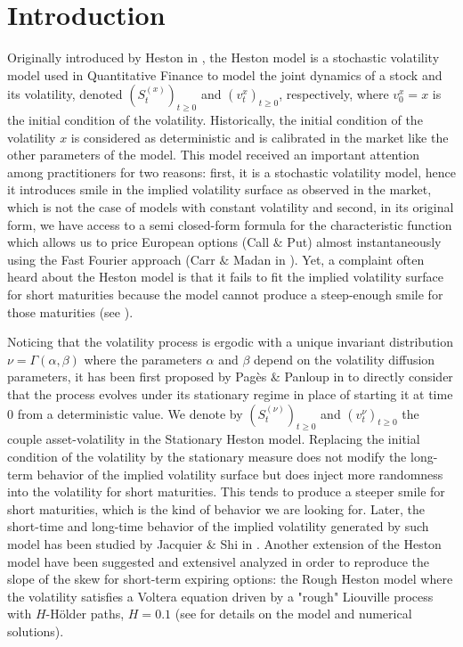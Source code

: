 

\section*{Introduction}


Originally introduced by Heston in \cite{heston1993closed}, the Heston model is a stochastic volatility model used in Quantitative Finance to model the joint dynamics of a stock and its volatility, denoted $(S_t^{(x)})_{t \geq 0}$ and $(v_t^x)_{t \geq 0}$, respectively, where $v_0^x = x$ is the initial condition of the volatility. Historically, the initial condition of the volatility $x$ is considered as deterministic and is calibrated in the market like the other parameters of the model. This model received an important attention among practitioners for two reasons: first, it is a stochastic volatility model, hence it introduces smile in the implied volatility surface as observed in the market, which is not the case of models with constant volatility and second, in its original form, we have access to a semi closed-form formula for the characteristic function which allows us to price European options (Call $\&$ Put) almost instantaneously using the Fast Fourier approach (Carr $\&$ Madan in \cite{carr1999option}). Yet, a complaint often heard about the Heston model is that it fails to fit the implied volatility surface for short maturities because the model cannot produce a steep-enough smile for those maturities (see \cite{gatheral2011volatility}).


Noticing that the volatility process is ergodic with a unique invariant distribution $\nu = \Gamma (\alpha, \beta)$ where the parameters $\alpha$ and $\beta$ depend on the volatility diffusion parameters, it has been first proposed by Pagès $\&$ Panloup in \cite{pages2009approximation} to directly consider that the process evolves under its stationary regime in place of starting it at time $0$ from a deterministic value. We denote by $(S_t^{(\nu)})_{t \geq 0}$ and $(v_t^{\nu})_{t \geq 0}$ the couple asset-volatility in the Stationary Heston model. Replacing the initial condition of the volatility by the stationary measure does not modify the long-term behavior of the implied volatility surface but does inject more randomness into the volatility for short maturities. This tends to produce a steeper smile for short maturities, which is the kind of behavior we are looking for. Later, the short-time and long-time behavior of the implied volatility generated by such model has been studied by Jacquier $\&$ Shi in \cite{jacquier2017randomized}. Another extension of the Heston model have been suggested and extensivel analyzed in order to reproduce the slope of the skew for short-term expiring options: the Rough Heston model where the volatility satisfies a Voltera equation driven by a "rough" Liouville process with $H$-Hölder paths, $H=0.1$ (see \cite{jaisson2016rough,guennoun2018asymptotic,gatheral2018volatility,giorgia2018fast,gatheral2019rational} for details on the model and numerical solutions).



